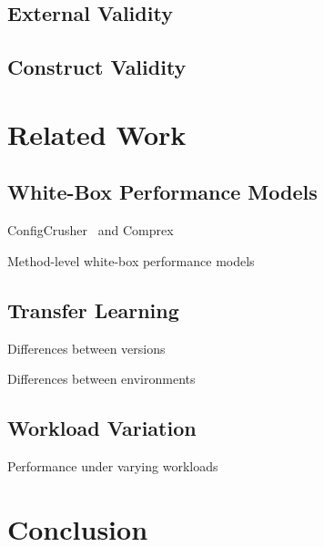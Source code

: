 \documentclass[conference]{IEEEtran}
\begin{document}
\subsection{External Validity}
\subsection{Construct Validity}
\section{Related Work}
\subsection{White-Box Performance Models}
ConfigCrusher~\cite{velez_2020_configcrusher_jase} and Comprex~\cite{velez_comprex_2021}

Method-level white-box performance models~\cite{weber_white_2021}
\subsection{Transfer Learning}
Differences between versions\cite{muehlbauer_identifying_2020}

Differences between environments~\cite{jamishidi_transfer_2017,jamshidi_learning_2018,jamshidi_transfer_gp_2017,muehlbauer_identifying_2020}
\subsection{Workload Variation}
Performance under varying workloads~\cite{liao_2020_using_emse}
\section{Conclusion}

\clearpage


\end{document}
